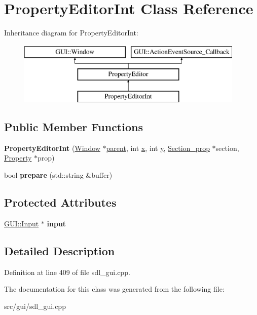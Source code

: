\hypertarget{classPropertyEditorInt}{\section{Property\-Editor\-Int Class Reference}
\label{classPropertyEditorInt}
}
Inheritance diagram for Property\-Editor\-Int\-:\begin{figure}[H]
\begin{center}
\leavevmode
\includegraphics[height=3.000000cm]{classPropertyEditorInt}
\end{center}
\end{figure}
\subsection*{Public Member Functions}
\begin{DoxyCompactItemize}
\item 
\hypertarget{classPropertyEditorInt_a0f41557774e65f1aa6a57313f3ebf824}{{\bfseries Property\-Editor\-Int} (\hyperlink{classGUI_1_1Window_ae828e9daa964dfc65a3550fb03117d30}{Window} $\ast$\hyperlink{classGUI_1_1Window_a2e593ff65e7702178d82fe9010a0b539}{parent}, int \hyperlink{classGUI_1_1Window_a6ca6a80ca00c9e1d8ceea8d3d99a657d}{x}, int \hyperlink{classGUI_1_1Window_a0ee8e923aff2c3661fc2e17656d37adf}{y}, \hyperlink{classSection__prop}{Section\-\_\-prop} $\ast$section, \hyperlink{classProperty}{Property} $\ast$prop)}\label{classPropertyEditorInt_a0f41557774e65f1aa6a57313f3ebf824}

\item 
\hypertarget{classPropertyEditorInt_a5905c05b04394d9c0f9ee1c332df339e}{bool {\bfseries prepare} (std\-::string \&buffer)}\label{classPropertyEditorInt_a5905c05b04394d9c0f9ee1c332df339e}

\end{DoxyCompactItemize}
\subsection*{Protected Attributes}
\begin{DoxyCompactItemize}
\item 
\hypertarget{classPropertyEditorInt_a9723b1ce18a08a85bbef9edec6b9fa06}{\hyperlink{classGUI_1_1Input}{G\-U\-I\-::\-Input} $\ast$ {\bfseries input}}\label{classPropertyEditorInt_a9723b1ce18a08a85bbef9edec6b9fa06}

\end{DoxyCompactItemize}


\subsection{Detailed Description}


Definition at line 409 of file sdl\-\_\-gui.\-cpp.



The documentation for this class was generated from the following file\-:\begin{DoxyCompactItemize}
\item 
src/gui/sdl\-\_\-gui.\-cpp\end{DoxyCompactItemize}
